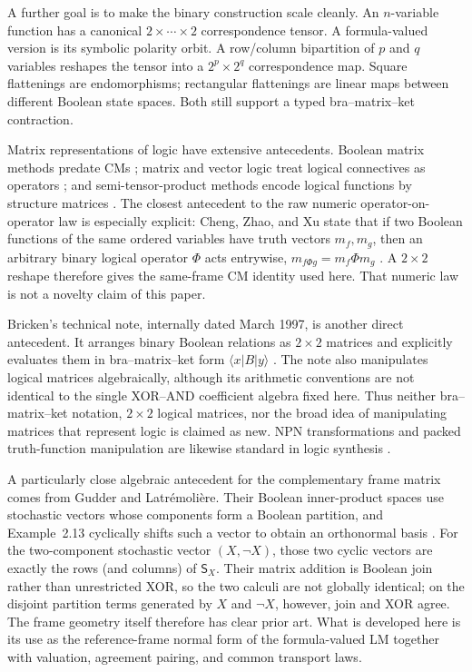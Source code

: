 \documentclass[11pt]{article}
\theoremstyle{definition}
\theoremstyle{remark}
\begin{document}
A further goal is to make the binary construction scale cleanly.  An $n$-variable function has a canonical $2\times\cdots\times2$ correspondence tensor.  A formula-valued version is its symbolic polarity orbit.  A row/column bipartition of $p$ and $q$ variables reshapes the tensor into a $2^p\times2^q$ correspondence map.  Square flattenings are endomorphisms; rectangular flattenings are linear maps between different Boolean state spaces.  Both still support a typed bra--matrix--ket contraction.

Matrix representations of logic have extensive antecedents.  Boolean matrix methods predate CMs \cite{Edwards1972}; matrix and vector logic treat logical connectives as operators \cite{Stern1988,Mizraji1992,Mizraji2008}; and semi-tensor-product methods encode logical functions by structure matrices \cite{ChengQi2010,ChengQiLi2011}.  The closest antecedent to the raw numeric operator-on-operator law is especially explicit: Cheng, Zhao, and Xu state that if two Boolean functions of the same ordered variables have truth vectors $m_f,m_g$, then an arbitrary binary logical operator $\Phi$ acts entrywise, $m_{f\Phi g}=m_f\Phi m_g$ \cite[Prop.~3.3]{Cheng2011}.  A $2\times2$ reshape therefore gives the same-frame CM identity used here.  That numeric law is not a novelty claim of this paper.

Bricken's technical note, internally dated March 1997, is another direct antecedent.  It arranges binary Boolean relations as $2\times2$ matrices and explicitly evaluates them in bra--matrix--ket form $\langle x|B|y\rangle$ \cite{Bricken1997}.  The note also manipulates logical matrices algebraically, although its arithmetic conventions are not identical to the single XOR--AND coefficient algebra fixed here.  Thus neither bra--matrix--ket notation, $2\times2$ logical matrices, nor the broad idea of manipulating matrices that represent logic is claimed as new.  NPN transformations and packed truth-function manipulation are likewise standard in logic synthesis \cite{Mishchenko2006,Zhou2019}.

A particularly close algebraic antecedent for the complementary frame matrix comes from Gudder and Latr\'emoli\`ere.  Their Boolean inner-product spaces use stochastic vectors whose components form a Boolean partition, and Example~2.13 cyclically shifts such a vector to obtain an orthonormal basis \cite[Example~2.13]{Gudder2009}.  For the two-component stochastic vector $(X,\neg X)$, those two cyclic vectors are exactly the rows (and columns) of $\mathsf S_X$.  Their matrix addition is Boolean join rather than unrestricted XOR, so the two calculi are not globally identical; on the disjoint partition terms generated by $X$ and $\neg X$, however, join and XOR agree.  The frame geometry itself therefore has clear prior art.  What is developed here is its use as the reference-frame normal form of the formula-valued LM together with valuation, agreement pairing, and common transport laws.
\end{document}
